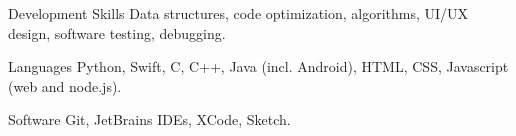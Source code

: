 
\begin{cvskills}

  \cvskill
    {Development Skills} %
    {Data structures, code optimization, algorithms, UI/UX design, software testing, debugging. } %

  \cvskill
    {Languages} %
    {Python, Swift, C, C++, Java (incl. Android), HTML, CSS, Javascript (web and node.js).} %

  \cvskill
    {Software} %
    {Git, JetBrains IDEs, XCode, Sketch.} %

\end{cvskills}
